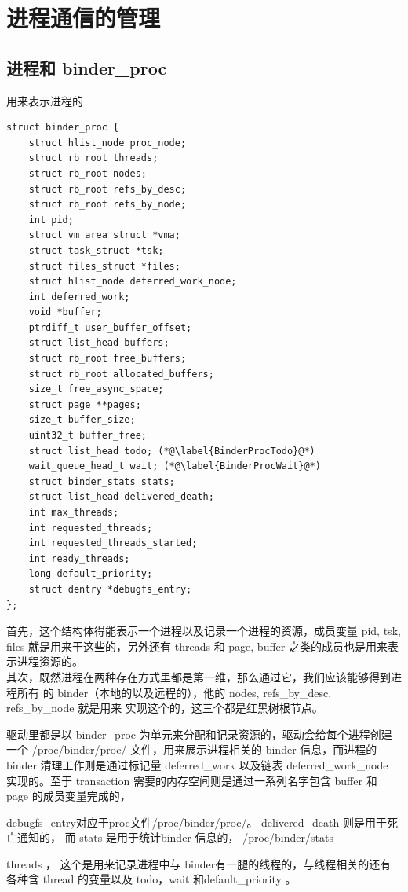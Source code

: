 \documentclass[a4paper,11pt]{article}
\begin{document}
\section{进程通信的管理}

\subsection{ 进程和 binder_proc }
用来表示进程的
\begin{lstlisting}[language=KC, multicols=2]
struct binder_proc {
    struct hlist_node proc_node;
    struct rb_root threads;
    struct rb_root nodes;
    struct rb_root refs_by_desc;
    struct rb_root refs_by_node;
    int pid;
    struct vm_area_struct *vma;
    struct task_struct *tsk;
    struct files_struct *files;
    struct hlist_node deferred_work_node;
    int deferred_work;
    void *buffer;
    ptrdiff_t user_buffer_offset;
    struct list_head buffers;
    struct rb_root free_buffers;
    struct rb_root allocated_buffers;
    size_t free_async_space;
    struct page **pages;
    size_t buffer_size;
    uint32_t buffer_free;
    struct list_head todo; (*@\label{BinderProcTodo}@*)
    wait_queue_head_t wait; (*@\label{BinderProcWait}@*)
    struct binder_stats stats;
    struct list_head delivered_death;
    int max_threads;
    int requested_threads;
    int requested_threads_started;
    int ready_threads;
    long default_priority;
    struct dentry *debugfs_entry;
};
\end{lstlisting}
首先，这个结构体得能表示一个进程以及记录一个进程的资源，成员变量 pid, tsk,
files 就是用来干这些的，另外还有 threads 和 page, buffer 之类的成员也是用来表
示进程资源的。\\
其次，既然进程在两种存在方式里都是第一维，那么通过它，我们应该能够得到进程所有
的 binder（本地的以及远程的），他的 nodes, refs_by_desc, refs_by_node 就是用来
实现这个的，这三个都是红黑树根节点。

驱动里都是以 binder_proc
为单元来分配和记录资源的，驱动会给每个进程创建一个 /proc/binder/proc/
文件，用来展示进程相关的 binder 信息，而进程的 binder 清理工作则是通过标记量
deferred_work 以及链表 deferred_work_node 实现的。至于 transaction
需要的内存空间则是通过一系列名字包含 buffer 和 page
的成员变量完成的，

debugfs_entry对应于proc文件/proc/binder/proc/。
 delivered_death 则是用于死亡通知的，
 而 stats 是用于统计binder 信息的， /proc/binder/stats

threads ， 这个是用来记录进程中与 binder有一腿的线程的，与线程相关的还有各种含 thread 的变量以及 todo，wait 和default_priority 。
\end{document}
